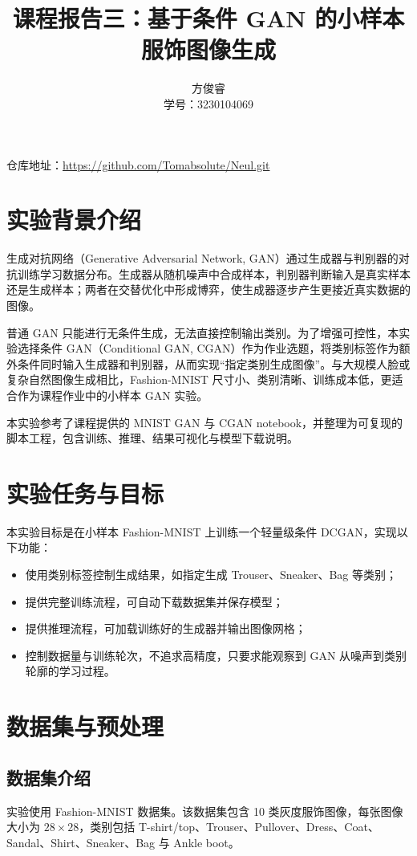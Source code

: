 \documentclass[a4paper,10pt,twocolumn]{article}
\title{课程报告三：基于条件 GAN 的小样本服饰图像生成}
\author{方俊睿\\学号：3230104069}
\date{}
\begin{document}
\maketitle

\noindent 仓库地址：\url{https://github.com/Tomabsolute/Neul.git}

\section{实验背景介绍}
生成对抗网络（Generative Adversarial Network, GAN）通过生成器与判别器的对抗训练学习数据分布。生成器从随机噪声中合成样本，判别器判断输入是真实样本还是生成样本；两者在交替优化中形成博弈，使生成器逐步产生更接近真实数据的图像。

普通 GAN 只能进行无条件生成，无法直接控制输出类别。为了增强可控性，本实验选择条件 GAN（Conditional GAN, CGAN）作为作业选题，将类别标签作为额外条件同时输入生成器和判别器，从而实现“指定类别生成图像”。与大规模人脸或复杂自然图像生成相比，Fashion-MNIST 尺寸小、类别清晰、训练成本低，更适合作为课程作业中的小样本 GAN 实验。

本实验参考了课程提供的 MNIST GAN 与 CGAN notebook，并整理为可复现的脚本工程，包含训练、推理、结果可视化与模型下载说明。

\section{实验任务与目标}
本实验目标是在小样本 Fashion-MNIST 上训练一个轻量级条件 DCGAN，实现以下功能：
\begin{itemize}
  \item 使用类别标签控制生成结果，如指定生成 Trouser、Sneaker、Bag 等类别；
  \item 提供完整训练流程，可自动下载数据集并保存模型；
  \item 提供推理流程，可加载训练好的生成器并输出图像网格；
  \item 控制数据量与训练轮次，不追求高精度，只要求能观察到 GAN 从噪声到类别轮廓的学习过程。
\end{itemize}

\section{数据集与预处理}
\subsection{数据集介绍}
实验使用 Fashion-MNIST 数据集。该数据集包含 10 类灰度服饰图像，每张图像大小为 $28\times28$，类别包括 T-shirt/top、Trouser、Pullover、Dress、Coat、Sandal、Shirt、Sneaker、Bag 与 Ankle boot。
\end{document}
